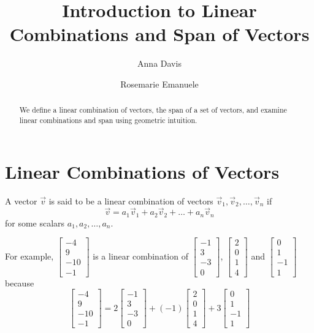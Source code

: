 \documentclass{ximera}
\author{Anna Davis \and Rosemarie Emanuele} \title{Introduction to Linear Combinations and Span of Vectors} \license{CC-BY 4.0}
\begin{document}
\begin{abstract}
  We define a linear combination of vectors, the span of a set of vectors, and examine linear combinations and span using geometric intuition.
\end{abstract}
\maketitle

\section*{Linear Combinations of Vectors}

\begin{definition}
A vector $\vec{v}$ is said to be a linear combination of vectors $\vec{v}_1, \vec{v}_2,\ldots, \vec{v}_n$ if 
$$\vec{v}=a_1\vec{v}_1+ a_2\vec{v}_2+\ldots + a_n\vec{v}_n$$
for some scalars $a_1, a_2, \ldots ,a_n$.
\end{definition}
For example, $\begin{bmatrix} -4\\9\\-10\\-1\end{bmatrix}$ is a linear combination of $\begin{bmatrix} -1\\3\\-3\\0\end{bmatrix}$,
$\begin{bmatrix} 2\\0\\1\\4\end{bmatrix}$ and $\begin{bmatrix} 0\\1\\-1\\1\end{bmatrix}$ because 
$$\begin{bmatrix} -4\\9\\-10\\-1\end{bmatrix}=2\begin{bmatrix} -1\\3\\-3\\0\end{bmatrix}+(-1)\begin{bmatrix} 2\\0\\1\\4\end{bmatrix}+3\begin{bmatrix} 0\\1\\-1\\1\end{bmatrix}$$
\end{document}
